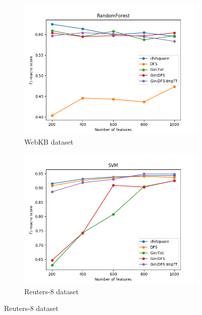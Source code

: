 \documentclass[a4paper, 14pt]{article}
\begin{document}
\begin{justify}
\begin{justify}
\begin{figure}[h!]
\centering
\begin{subfigure}{0.5\textwidth}
  \centering
  \includegraphics[width=1.1\linewidth]{pf1_macro_webkb_randomforest.png}
  \caption{WebKB dataset}
  \label{fi3:sub3}
\end{subfigure}%
\begin{subfigure}{.5\textwidth}
  \includegraphics[width=1.1\linewidth]{pf1_macro_r8_svm.png}
  \caption{Reuters-8 dataset}
  \label{fig:sub2}
\end{subfigure}
\label{fig4:test4}
\end{figure}



\end{justify}
\end{justify}
\end{document}
